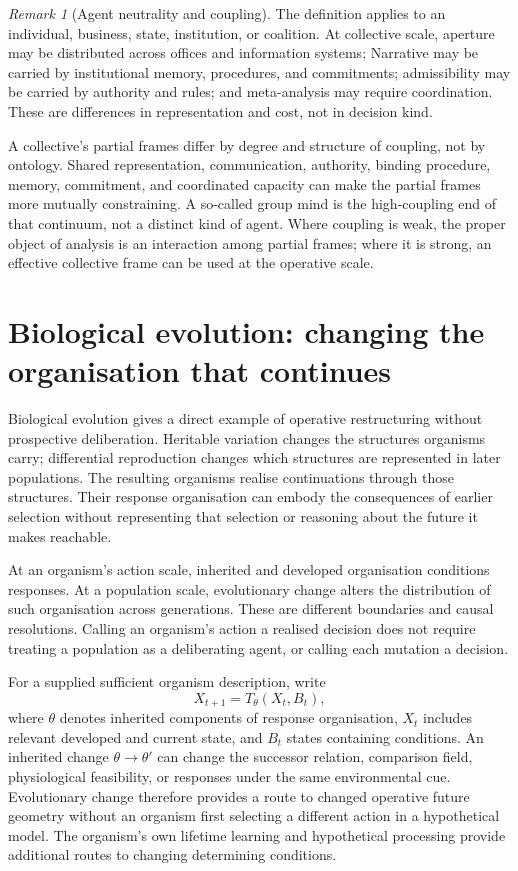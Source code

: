 \documentclass[11pt,a4paper]{article}
\theoremstyle{remark}
\newtheorem{remark}[definition]{Remark}
\begin{document}
\begin{remark}[Agent neutrality and coupling]\label{rem:coupling}
The definition applies to an individual, business, state, institution, or
coalition. At collective scale, aperture may be distributed across offices and
information systems; Narrative may be carried by institutional memory,
procedures, and commitments; admissibility may be carried by authority and
rules; and meta-analysis may require coordination. These are differences in
representation and cost, not in decision kind.

A collective's partial frames differ by degree and structure of coupling, not
by ontology. Shared representation, communication, authority, binding
procedure, memory, commitment, and coordinated capacity can make the partial
frames more mutually constraining. A so-called group mind is the high-coupling
end of that continuum, not a distinct kind of agent. Where coupling is weak,
the proper object of analysis is an interaction among partial frames; where it
is strong, an effective collective frame can be used at the operative scale.
\end{remark}

\section{Biological evolution: changing the organisation that continues}\label{sec:evolution}

Biological evolution gives a direct example of operative restructuring
without prospective deliberation. Heritable variation changes the structures
organisms carry; differential reproduction changes which structures are
represented in later populations. The resulting organisms realise
continuations through those structures. Their response organisation can
embody the consequences of earlier selection without representing that
selection or reasoning about the future it makes reachable.

At an organism's action scale, inherited and developed organisation conditions
responses. At a population scale, evolutionary change alters the distribution
of such organisation across generations. These are different boundaries and
causal resolutions. Calling an organism's action a realised decision does
not require treating a population as a deliberating agent, or calling each
mutation a decision.

For a supplied sufficient organism description, write
\[
X_{t+1}=T_{\theta}(X_t,B_t),
\]
where \(\theta\) denotes inherited components of response organisation,
\(X_t\) includes relevant developed and current state, and \(B_t\) states
containing conditions. An inherited change \(\theta\to\theta'\) can change
the successor relation, comparison field, physiological feasibility, or
responses under the same environmental cue. Evolutionary change therefore
provides a route to changed operative future geometry without an organism
first selecting a different action in a hypothetical model. The organism's
own lifetime learning and hypothetical processing provide additional routes
to changing determining conditions.
\end{document}
